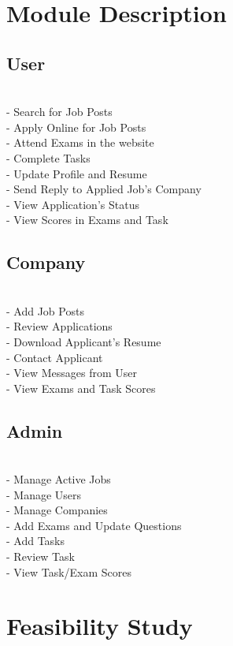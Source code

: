 \documentclass[a4paper,12pt]{report}
\begin{document}
\pagebreak

\section{Module Description}
\subsection{User}

\subitem
\\ - Search for Job Posts
\\ - Apply Online for Job Posts
\\ - Attend Exams in the website
\\ - Complete Tasks
\\ - Update Profile and Resume
\\ - Send Reply to Applied Job's Company
\\ - View Application's Status
\\ - View Scores in Exams and Task

\subsection{Company}

\subitem
\\ - Add Job Posts
\\ - Review Applications
\\ - Download Applicant's Resume
\\ - Contact Applicant
\\ - View Messages from User
\\ - View Exams and Task Scores

\subsection{Admin}

\subitem
\\ - Manage Active Jobs
\\ - Manage Users
\\ - Manage Companies
\\ - Add Exams and Update Questions
\\ - Add Tasks
\\ - Review Task
\\ - View Task/Exam Scores

\pagebreak


\section{Feasibility Study}
\end{document}
